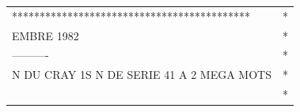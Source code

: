 {\small\ttfamily
\begin{tabular}{@{}l@{}l@{}}
*******************************************&*\\
EMBRE 1982&*\\
----------&*\\
N DU CRAY 1S N DE SERIE 41 A 2 MEGA MOTS\hspace{1em}&*\\
&*
\end{tabular}}
\clearpage
